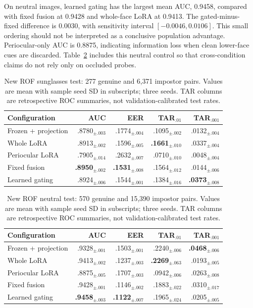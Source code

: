 \documentclass[10pt,journal,compsoc]{IEEEtran}
\begin{document}
On neutral images, learned gating has the largest mean AUC, 0.9458, compared with fixed fusion at 0.9428 and whole-face LoRA at 0.9413. The gated-minus-fixed difference is 0.0030, with sensitivity interval $[-0.0046,0.0106]$. This small ordering should not be interpreted as a conclusive population advantage. Periocular-only AUC is 0.8875, indicating information loss when clean lower-face cues are discarded. Table~\ref{tab:rofneutral} includes this neutral control so that cross-condition claims do not rely only on occluded probes.
\begin{table}[t]
\centering
\setlength{\tabcolsep}{2.2pt}
\caption{New ROF sunglasses test: 277 genuine and 6,371 impostor pairs. Values are mean with sample seed SD in subscripts; three seeds. TAR columns are retrospective ROC summaries, not validation-calibrated test rates.}
\label{tab:rofsunglasses}
\begin{tabular}{lrrrr}
\toprule
Configuration & AUC & EER & TAR$_{.01}$ & TAR$_{.001}$\\
\midrule
Frozen + projection & .8780$_{\pm.003}$ & .1774$_{\pm.004}$ & .1095$_{\pm.002}$ & .0132$_{\pm.004}$\\
Whole LoRA & .8913$_{\pm.002}$ & .1596$_{\pm.005}$ & \textbf{.1661}$_{\pm.010}$ & .0337$_{\pm.004}$\\
Periocular LoRA & .7905$_{\pm.014}$ & .2632$_{\pm.007}$ & .0710$_{\pm.010}$ & .0048$_{\pm.004}$\\
Fixed fusion & \textbf{.8950}$_{\pm.002}$ & \textbf{.1531}$_{\pm.008}$ & .1564$_{\pm.012}$ & .0144$_{\pm.006}$\\
Learned gating & .8924$_{\pm.006}$ & .1544$_{\pm.001}$ & .1384$_{\pm.016}$ & \textbf{.0373}$_{\pm.008}$\\
\bottomrule
\end{tabular}
\end{table}
\begin{table}[t]
\centering
\setlength{\tabcolsep}{2.2pt}
\caption{New ROF neutral test: 570 genuine and 15,390 impostor pairs. Values are mean with sample seed SD in subscripts; three seeds. TAR columns are retrospective ROC summaries, not validation-calibrated test rates.}
\label{tab:rofneutral}
\begin{tabular}{lrrrr}
\toprule
Configuration & AUC & EER & TAR$_{.01}$ & TAR$_{.001}$\\
\midrule
Frozen + projection & .9328$_{\pm.001}$ & .1503$_{\pm.001}$ & .2240$_{\pm.006}$ & \textbf{.0468}$_{\pm.006}$\\
Whole LoRA & .9413$_{\pm.002}$ & .1237$_{\pm.003}$ & \textbf{.2269}$_{\pm.063}$ & .0193$_{\pm.005}$\\
Periocular LoRA & .8875$_{\pm.005}$ & .1707$_{\pm.003}$ & .0942$_{\pm.006}$ & .0263$_{\pm.008}$\\
Fixed fusion & .9428$_{\pm.001}$ & .1146$_{\pm.002}$ & .1883$_{\pm.022}$ & .0310$_{\pm.017}$\\
Learned gating & \textbf{.9458}$_{\pm.003}$ & \textbf{.1122}$_{\pm.007}$ & .1965$_{\pm.024}$ & .0205$_{\pm.005}$\\
\bottomrule
\end{tabular}
\end{table}
\end{document}
